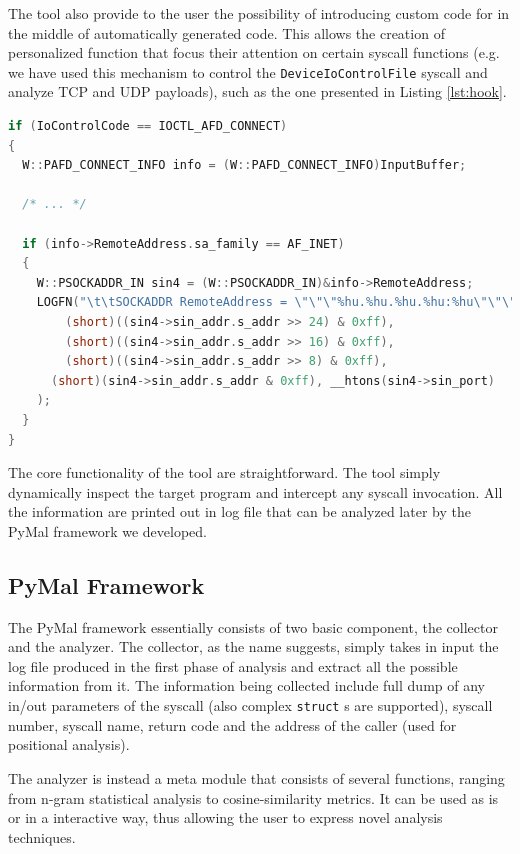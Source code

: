 \documentclass{article}
\begin{document}
The tool also provide to the user the possibility of introducing custom code for in the middle of automatically generated code. This allows the creation of personalized function that focus their attention on certain syscall functions (e.g. we have used this mechanism to control the \texttt{DeviceIoControlFile} syscall and analyze TCP and UDP payloads), such as the one presented in Listing \ref{lst:hook}.

\begin{lstlisting}[language=C,caption={DeviceIoControlFile hooking},label=lst:hook]
if (IoControlCode == IOCTL_AFD_CONNECT)
{
  W::PAFD_CONNECT_INFO info = (W::PAFD_CONNECT_INFO)InputBuffer;

  /* ... */

  if (info->RemoteAddress.sa_family == AF_INET)
  {
    W::PSOCKADDR_IN sin4 = (W::PSOCKADDR_IN)&info->RemoteAddress;
    LOGFN("\t\tSOCKADDR RemoteAddress = \"\"\"%hu.%hu.%hu.%hu:%hu\"\"\"\n",
        (short)((sin4->sin_addr.s_addr >> 24) & 0xff),
        (short)((sin4->sin_addr.s_addr >> 16) & 0xff),
        (short)((sin4->sin_addr.s_addr >> 8) & 0xff),
      (short)(sin4->sin_addr.s_addr & 0xff), __htons(sin4->sin_port)
    );
  }
}
\end{lstlisting}

The core functionality of the tool are straightforward. The tool simply dynamically inspect the target program and intercept any syscall invocation. All the information are printed out in log file that can be analyzed later by the PyMal framework we developed.

\subsection{PyMal Framework}

The PyMal framework essentially consists of two basic component, the collector and the analyzer. The collector, as the name suggests, simply takes in input the log file produced in the first phase of analysis and extract all the possible information from it. The information being collected include full dump of any in/out parameters of the syscall (also complex \texttt{struct} s are supported), syscall number, syscall name, return code and the address of the caller (used for positional analysis).

The analyzer is instead a meta module that consists of several functions, ranging from n-gram statistical analysis to cosine-similarity metrics. It can be used as is or in a interactive way, thus allowing the user to express novel analysis techniques.
\end{document}
